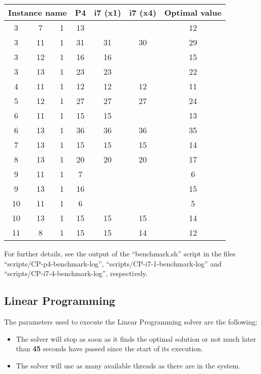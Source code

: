\begin{table}[H]
\centering
	\begin{tabular}{ccccccc}
		\multicolumn{3}{c}{Instance name}
					& P4		& i7 (x1)	& i7 (x4)	& Optimal value \\
		\midrule
		 3 &  7 & 1	& 13		&  			&  			& 12 \\
		 3 & 11 & 1	& 31		&  31		& 30			& 29 \\
		 3 & 12 & 1	& 16		&  16		&  			& 15 \\
		 3 & 13 & 1	& 23		&  23		&  			& 22 \\
		 4 & 11 & 1	& 12		&  12		& 12			& 11 \\
		 5 & 12 & 1	& 27		&  27		& 27			& 24 \\
		 6 & 11 & 1	& 15		&  15		&  			& 13 \\
		 6 & 13 & 1	& 36		&  36		& 36			& 35 \\
		 7 & 13 & 1	& 15		&  15		& 15			& 14 \\
		 8 & 13 & 1	& 20		&  20		& 20			& 17 \\
		 9 & 11 & 1	&  7		&   			&  			&  6 \\
		 9 & 13 & 1	& 16		&   			&  			& 15 \\
		10 & 11 & 1	&  6		&   			&  			&  5 \\
		10 & 13 & 1	& 15		&  15		& 15			& 14 \\
		11 &  8 & 1	& 15		&  15		& 14			& 12 \\
	\end{tabular}
	\label{table:benchmark:CP-results:suboptimalinstances}
\end{table}

For further details, see the output of the ``benchmark.sh'' script in the files
``scripts/CP-p4-benchmark-log'', ``scripts/CP-i7-1-benchmark-log'' and
``scripts/CP-i7-4-benchmark-log'', respectively.

\subsection{Linear Programming}
\label{sec:benchmarking:linear-programming}

The parameters used to execute the Linear Programming solver are the following:
\begin{itemize}
	\item The solver will stop as soon as it finds the optimal solution or not much
	later than \textbf{45} seconds have passed since the start of its execution.
	\item The solver will use as many available threads as there are in the system.
\end{itemize}

